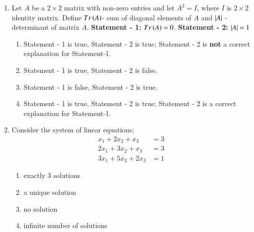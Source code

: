 \documentclass[journal,12pt,twocolumn]{IEEEtran}
\theoremstyle{remark}
\begin{document}
\begin{enumerate}
	\begin{enumerate}

	\end{enumerate}

    \item Let $A$ be a $2\times2$ matrix with non-zero entries and let $A^2 = I$, where $I$ is $2\times2$ identity matrix. Define 
	\newline
	$Tr\left(A\right)$- sum of diagonal elements of $A$ and
	\newline
	$\left\vert A\right\vert$ - determinant of matrix $A$.
	\newline
	\textbf{Statement - 1:} $Tr\left(A\right) = 0$.
	\newline
	\textbf{Statement - 2:} $\left\vert A\right\vert = 1$

	\hfill{\brak{2010}}
	\begin{enumerate}
		\item Statement - 1 is true, Statement - 2 is true; Statement - 2 is \textbf{not} a correct explanation for Statement-1. 
	    	\item Statement - 1 is true, Statement - 2 is false. 
	    	\item Statement - 1 is false, Statement - 2 is true.
	    	\item Statement - 1 is true, Statement - 2 is true; Statement - 2 is a correct explanation for Statement-1. 
	\end{enumerate}

    \item Consider the system of linear equations;
	\begin{align*}
		x_1 + 2x_2 + x_3 &= 3\\
		2x_1 + 3x_2 + x_3 &= 3\\
		3x_1 + 5x_2 + 2x_3 &= 1
	\end{align*}
	\hfill{}{\par}
	\begin{enumerate}
		\item exactly $3$ solutions
	    	\item a unique solution
	    	\item no solution
	    	\item infinite number of solutions
	\end{enumerate}


\end{enumerate}
\end{document}
